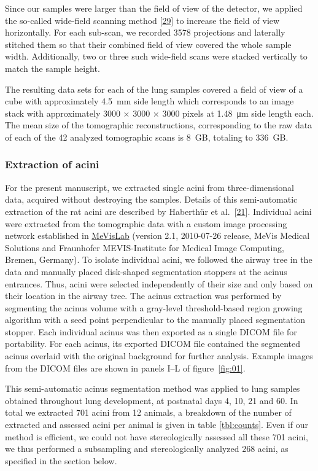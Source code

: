 \documentclass[
  american,
]{article}
\begin{document}
Since our samples were larger than the field of view of the detector, we applied the so-called wide-field scanning method {[}\protect\hyperlink{ref-VELl7OiR}{29}{]} to increase the field of view horizontally.
For each sub-scan, we recorded 3578 projections and laterally stitched them so that their combined field of view covered the whole sample width.
Additionally, two or three such wide-field scans were stacked vertically to match the sample height.

The resulting data sets for each of the lung samples covered a field of view of a cube with approximately 4.5~mm side length which corresponds to an image stack with approximately 3000 × 3000 × 3000 pixels at 1.48~μm side length each.
The mean size of the tomographic reconstructions, corresponding to the raw data of each of the 42 analyzed tomographic scans is 8~GB, totaling to 336~GB.

\hypertarget{extraction-of-acini}{%
\subsubsection{Extraction of acini}\label{extraction-of-acini}}

For the present manuscript, we extracted single acini from three-dimensional data, acquired without destroying the samples.
Details of this semi-automatic extraction of the rat acini are described by Haberthür et al.~{[}\protect\hyperlink{ref-7YLeeyu}{21}{]}.
Individual acini were extracted from the tomographic data with a custom image processing network established in \href{https://www.mevislab.de/}{MeVisLab} (version 2.1, 2010-07-26 release, MeVis Medical Solutions and Fraunhofer MEVIS-Institute for Medical Image Computing, Bremen, Germany).
To isolate individual acini, we followed the airway tree in the data and manually placed disk-shaped segmentation stoppers at the acinus entrances.
Thus, acini were selected independently of their size and only based on their location in the airway tree.
The acinus extraction was performed by segmenting the acinus volume with a gray-level threshold-based region growing algorithm with a seed point perpendicular to the manually placed segmentation stopper.
Each individual acinus was then exported as a single DICOM file for portability.
For each acinus, its exported DICOM file contained the segmented acinus overlaid with the original background for further analysis.
Example images from the DICOM files are shown in panels I--L of figure~\ref{fig:01}.

This semi-automatic acinus segmentation method was applied to lung samples obtained throughout lung development, at postnatal days 4, 10, 21 and 60.
In total we extracted 701 acini from 12 animals, a breakdown of the number of extracted and assessed acini per animal is given in table \ref{tbl:counts}.
Even if our method is efficient, we could not have stereologically assessed all these 701 acini, we thus performed a subsampling and stereologically analyzed 268 acini, as specified in the section below.
\end{document}
